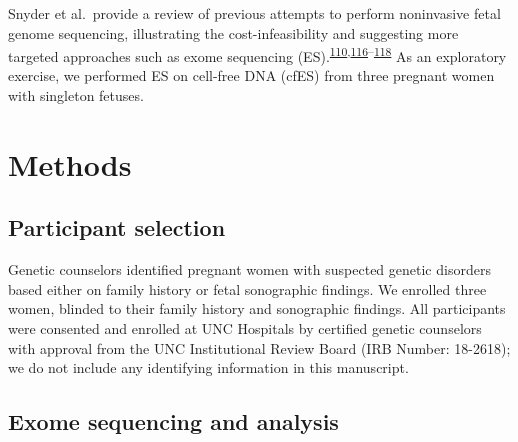 \documentclass[11pt,letterpaper]{book}
\begin{document}
Snyder et al.~provide a review of previous attempts to perform noninvasive fetal genome sequencing, illustrating the cost-infeasibility and suggesting more targeted approaches such as exome sequencing (ES).\textsuperscript{\protect\hyperlink{ref-lo:2010aa}{110},\protect\hyperlink{ref-fan:2012aa}{116}--\protect\hyperlink{ref-snyder:2013aa}{118}}
As an exploratory exercise, we performed ES on cell-free DNA (cfES) from three pregnant women with singleton fetuses.

\hypertarget{methods-1}{%
\section{Methods}\label{methods-1}}

\hypertarget{participant-selection}{%
\subsection{Participant selection}\label{participant-selection}}

Genetic counselors identified pregnant women with suspected genetic disorders based either on family history or fetal sonographic findings.
We enrolled three women, blinded to their family history and sonographic findings.
All participants were consented and enrolled at UNC Hospitals by certified genetic counselors with approval from the UNC Institutional Review Board (IRB Number: 18-2618); we do not include any identifying information in this manuscript.

\hypertarget{exome-sequencing-and-analysis}{%
\subsection{Exome sequencing and analysis}\label{exome-sequencing-and-analysis}}
\end{document}
